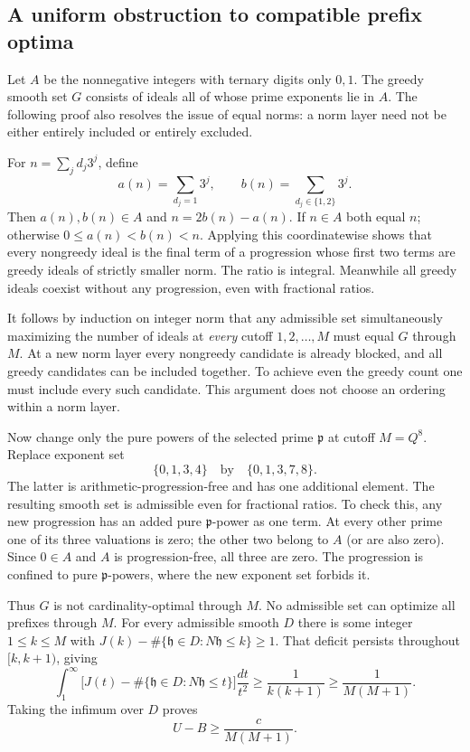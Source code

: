 \subsection{A uniform obstruction to compatible prefix optima}

Let $A$ be the nonnegative integers with ternary digits only $0,1$.
The greedy smooth set $G$ consists of ideals all of whose prime
exponents lie in $A$.  The following proof also resolves the issue of
equal norms: a norm layer need not be either entirely included or
entirely excluded.

For $n=\sum_j d_j3^j$, define
\[
 a(n)=\sum_{d_j=1}3^j,\qquad
 b(n)=\sum_{d_j\in\{1,2\}}3^j.
\]
Then $a(n),b(n)\in A$ and $n=2b(n)-a(n)$.  If $n\in A$ both equal
$n$; otherwise $0\le a(n)<b(n)<n$.  Applying this coordinatewise
shows that every nongreedy ideal is the final term of a progression
whose first two terms are greedy ideals of strictly smaller norm.
The ratio is integral.  Meanwhile all greedy ideals coexist without
any progression, even with fractional ratios.

It follows by induction on integer norm that any admissible set
simultaneously maximizing the number of ideals at \emph{every} cutoff
$1,2,\ldots,M$ must equal $G$ through $M$.  At a new norm layer every
nongreedy candidate is already blocked, and all greedy candidates can
be included together.  To achieve even the greedy count one must
include every such candidate.  This argument does not choose an
ordering within a norm layer.

Now change only the pure powers of the selected prime $\mathfrak p$
at cutoff $M=Q^8$.  Replace exponent set
\[
                    \{0,1,3,4\}\quad\text{by}\quad
                    \{0,1,3,7,8\}.
\]
The latter is arithmetic-progression-free and has one additional
element.  The resulting smooth set is admissible even for fractional
ratios.  To check this, any new progression has an added pure
$\mathfrak p$-power as one term.  At every other prime one of its
three valuations is zero; the other two belong to $A$ (or are also
zero).  Since $0\in A$ and $A$ is progression-free, all three are
zero.  The progression is confined to pure $\mathfrak p$-powers,
where the new exponent set forbids it.

Thus $G$ is not cardinality-optimal through $M$.  No admissible set
can optimize all prefixes through $M$.  For every admissible smooth
$D$ there is some integer $1\le k\le M$ with
$J(k)-\#\{\mathfrak h\in D:N\mathfrak h\le k\}\ge1$.
That deficit persists throughout $[k,k+1)$, giving
\[
 \int_1^\infty
 \bigl[J(t)-\#\{\mathfrak h\in D:N\mathfrak h\le t\}\bigr]
          \frac{dt}{t^2}
 \ge\frac1{k(k+1)}\ge\frac1{M(M+1)}.
\]
Taking the infimum over $D$ proves
\begin{equation}\label{eq:BUgap}
                         U-B\ge\frac{c}{M(M+1)}.
\end{equation}

